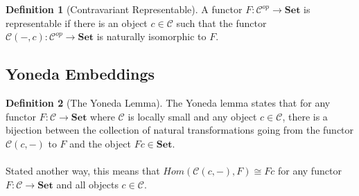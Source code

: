 \documentclass[12pt]{article}
\theoremstyle{definition}
\newtheorem{definition}{Definition}
\begin{document}
\begin{definition}[Contravariant Representable]
    A functor $F:\mathcal{C}^{op}\rightarrow\mathbf{Set}$ is representable if there is an object $c\in\mathcal{C}$ such that the functor $\mathcal{C}(-,c):\mathcal{C}^{op}\rightarrow \mathbf{Set}$ is naturally isomorphic to $F$.
\end{definition}

\subsection*{Yoneda Embeddings}




\begin{definition}[The Yoneda Lemma]
    The Yoneda lemma states that for any functor $F:\mathcal{C}\rightarrow\mathbf{Set}$ where $\mathcal{C}$ is locally small and any object $c\in\mathcal{C}$, there is a bijection between the collection of natural transformations going from the functor $\mathcal{C}(c,-)$ to $F$ and the object $Fc\in\mathbf{Set}$.
    \\\\Stated another way, this means that $Hom(\mathcal{C}(c,-), F)\cong Fc$ for any functor $F:\mathcal{C}\rightarrow\mathbf{Set}$ and all objects $c\in\mathcal{C}$.

\end{definition}






\pagebreak
\end{document}
